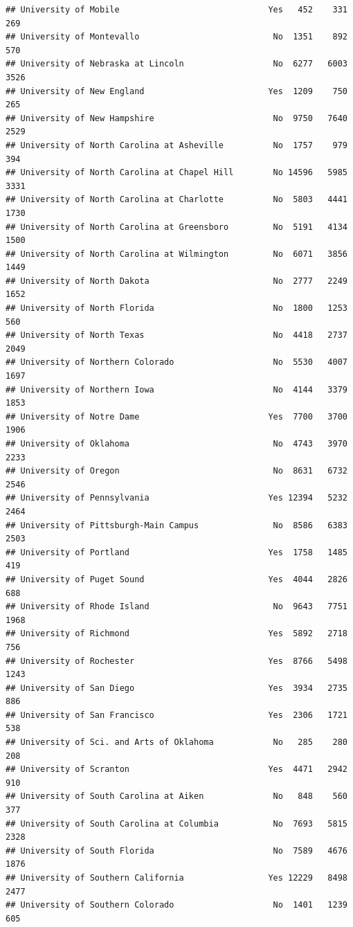 \documentclass[
]{article}
\begin{document}
\begin{verbatim}
## University of Mobile                              Yes   452    331    269
## University of Montevallo                           No  1351    892    570
## University of Nebraska at Lincoln                  No  6277   6003   3526
## University of New England                         Yes  1209    750    265
## University of New Hampshire                        No  9750   7640   2529
## University of North Carolina at Asheville          No  1757    979    394
## University of North Carolina at Chapel Hill        No 14596   5985   3331
## University of North Carolina at Charlotte          No  5803   4441   1730
## University of North Carolina at Greensboro         No  5191   4134   1500
## University of North Carolina at Wilmington         No  6071   3856   1449
## University of North Dakota                         No  2777   2249   1652
## University of North Florida                        No  1800   1253    560
## University of North Texas                          No  4418   2737   2049
## University of Northern Colorado                    No  5530   4007   1697
## University of Northern Iowa                        No  4144   3379   1853
## University of Notre Dame                          Yes  7700   3700   1906
## University of Oklahoma                             No  4743   3970   2233
## University of Oregon                               No  8631   6732   2546
## University of Pennsylvania                        Yes 12394   5232   2464
## University of Pittsburgh-Main Campus               No  8586   6383   2503
## University of Portland                            Yes  1758   1485    419
## University of Puget Sound                         Yes  4044   2826    688
## University of Rhode Island                         No  9643   7751   1968
## University of Richmond                            Yes  5892   2718    756
## University of Rochester                           Yes  8766   5498   1243
## University of San Diego                           Yes  3934   2735    886
## University of San Francisco                       Yes  2306   1721    538
## University of Sci. and Arts of Oklahoma            No   285    280    208
## University of Scranton                            Yes  4471   2942    910
## University of South Carolina at Aiken              No   848    560    377
## University of South Carolina at Columbia           No  7693   5815   2328
## University of South Florida                        No  7589   4676   1876
## University of Southern California                 Yes 12229   8498   2477
## University of Southern Colorado                    No  1401   1239    605

\end{verbatim}
\end{document}
